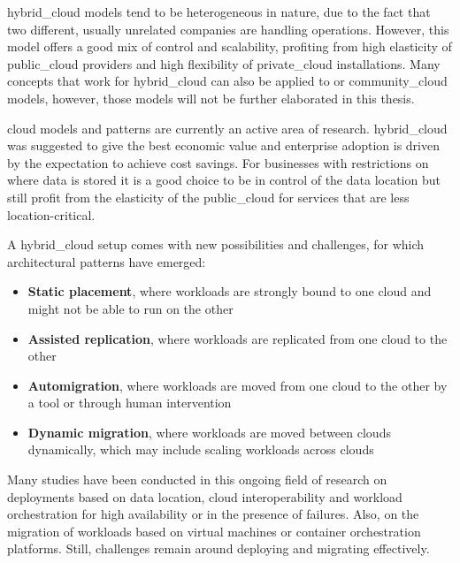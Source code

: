 \documentclass[../main.tex]{subfiles}
\begin{document}
     \Gls{hybrid_cloud}  models tend to be heterogeneous in nature, due to the fact that two different, usually unrelated companies are handling operations.
    However, this model offers a good mix of control and scalability, profiting from high elasticity of \gls{public_cloud} providers and high flexibility of \gls{private_cloud} installations.
    Many concepts that work for \gls{hybrid_cloud} can also be applied to  or \gls{community_cloud} models, however, those models will not be further elaborated in this thesis.

    \Gls{cloud} models and patterns are currently an active area of research.
     \Gls{hybrid_cloud}  was suggested to give the best economic value\cite{policy_hc_deploy} and enterprise adoption is driven by the expectation to achieve cost savings\cite{hc_patterns}.
    For businesses with restrictions on where data is stored it is a good choice to be in control of the data location but still profit from the elasticity of the \gls{public_cloud} for services that are less location-critical\cite{policy_hc_deploy}.

    A \gls{hybrid_cloud} setup comes with new possibilities and challenges, for which architectural patterns have emerged\cite{hc_patterns}:
    \begin{itemize}
        \setlength\itemsep{0em}
        \item \textbf{Static placement}, where workloads are strongly bound to one \gls{cloud} and might not be able to run on the other
        \item \textbf{Assisted replication}, where workloads are replicated from one \gls{cloud} to the other
        \item \textbf{Automigration}, where workloads are moved from one \gls{cloud} to the other by a tool or through human intervention
        \item \textbf{Dynamic migration}, where workloads are moved between \glspl{cloud} dynamically, which may include scaling workloads across \glspl{cloud}
    \end{itemize}

     Many studies have been conducted in this ongoing field of research on deployments based on data location\cite{policy_hc_deploy}, \gls{cloud} interoperability\cite{policy_driven_hc_mw} and workload orchestration for high availability\cite{orchestrating_ha_deployment} or in the presence of failures\cite{rc_prov_policy_failures,failure_aware_placement}.
    Also, on the migration of workloads based on virtual machines\cite{policy_mc_migr} or container orchestration platforms\cite{rw_migr_cloud_apps}.
    Still, challenges remain around deploying and migrating effectively.
\end{document}
